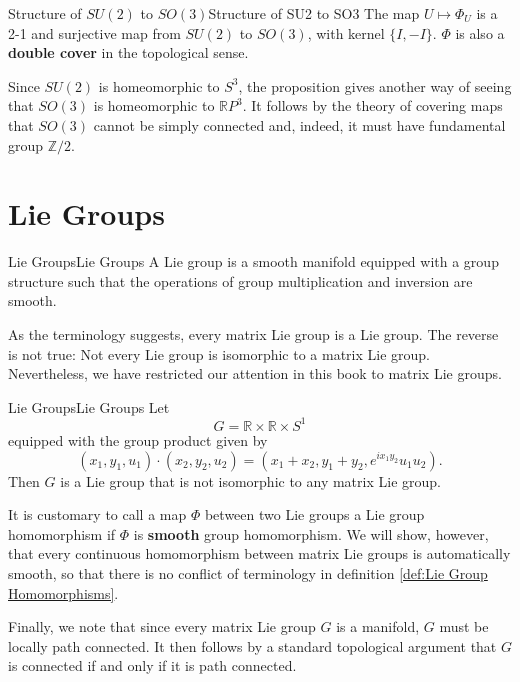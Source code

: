 \documentclass[../main.tex]{subfiles}
\begin{document}
\begin{proposition}{Structure of $SU(2)$ to $SO(3)$}{Structure of SU2 to SO3}
	The map $U \mapsto \Phi_U$ is a 2-1 and surjective map from $SU(2)$ to $SO(3)$, with kernel $\{I, -I\}$. $\Phi$ is also a \textbf{double cover} in the topological sense.
\end{proposition}

\begin{remark}
	Since $SU(2)$ is homeomorphic to $S^3$, the proposition gives another way of seeing that $SO(3)$ is homeomorphic to $\mathbb{R}P^3$. It follows by the theory of covering maps that $SO(3)$ cannot be simply connected and, indeed, it must have fundamental group $\mathbb{Z} / 2$.
\end{remark}

\section{Lie Groups}
\begin{definition}{Lie Groups}{Lie Groups}
	A Lie group is a smooth manifold equipped with a group structure such that the operations of group multiplication and inversion are smooth.
\end{definition}
As the terminology suggests, every matrix Lie group is a Lie group. The reverse is not true: Not every Lie group is isomorphic to a matrix Lie group. Nevertheless, we have restricted our attention in this book to matrix Lie groups.

\begin{example}{Lie Groups}{Lie Groups}
	Let
	\begin{equation}
		G = \mathbb{R} \times \mathbb{R} \times S^1
	\end{equation}
	equipped with the group product given by 
	\begin{equation}
		(x_1, y_1, u_1) \cdot (x_2, y_2, u_2) = (x_1 + x_2, y_1 + y_2, e^{i x_1 y_2} u_1 u_2).
	\end{equation}
	Then $G$ is a Lie group that is not isomorphic to any matrix Lie group.
\end{example}

\begin{remark}
	It is customary to call a map $\Phi$ between two Lie groups a Lie group homomorphism if $\Phi$ is \textbf{smooth} group homomorphism. We will show, however, that every continuous homomorphism between matrix Lie groups is automatically smooth, so that there is no conflict of terminology in definition \ref{def:Lie Group Homomorphisms}.

	Finally, we note that since every matrix Lie group $G$ is a manifold, $G$ must be locally path connected. It then follows by a standard topological argument that $G$ is connected if and only if it is path connected.
\end{remark}
\end{document}
